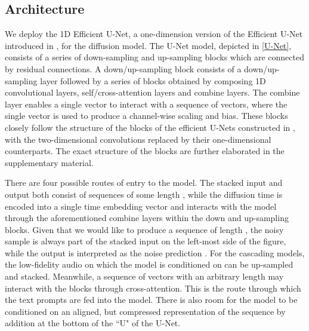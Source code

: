 \documentclass[nohyperref]{article}
\theoremstyle{plain}
\theoremstyle{definition}
\theoremstyle{remark}
\begin{document}
\subsection{Architecture}

We deploy the 1D Efficient U-Net, a one-dimension version of the Efficient U-Net introduced in \cite{saharia2022photorealistic}, for the diffusion model. The U-Net model, depicted in \cref{U-Net}, consists of a series of down-sampling and up-sampling blocks which are connected by residual connections. A down/up-sampling block consists of a down/up-sampling layer followed by a series of blocks obtained by composing 1D convolutional layers, self/cross-attention layers and combine layers. The combine layer enables a single vector to interact with a sequence of vectors, where the single vector is used to produce a channel-wise scaling and bias. These blocks closely follow the structure of the blocks of the efficient U-Nets constructed in \cite{saharia2022photorealistic}, with the two-dimensional convolutions replaced by their one-dimensional counterparts. The exact structure of the blocks are further elaborated in the supplementary material.

There are four possible routes of entry to the model. The stacked input and output both consist of sequences of some length , while the diffusion time  is encoded into a single time embedding vector and interacts with the model through the aforementioned combine layers within the down and up-sampling blocks. Given that we would like to produce a sequence of length , the noisy sample  is always part of the stacked input on the left-most side of the figure, while the output is interpreted as the noise prediction . For the cascading models, the low-fidelity audio on which the model is conditioned on can be up-sampled and stacked. Meanwhile, a sequence of vectors with an arbitrary length may interact with the blocks through cross-attention. This is the route through which the text prompts are fed into the model. There is also room for the model to be conditioned on an aligned, but compressed representation of the sequence by addition at the bottom of the ``U" of the U-Net.
\end{document}
